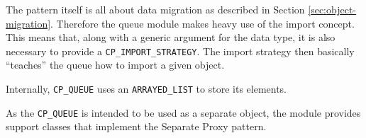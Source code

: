 The pattern itself is all about data migration as described in Section \ref{sec:object-migration}.
Therefore the queue module makes heavy use of the import concept.
This means that, along with a generic argument for the data type, it is also necessary to provide a \lstinline!CP_IMPORT_STRATEGY!.
The import strategy then basically ``teaches'' the queue how to import a given object.

Internally, \lstinline!CP_QUEUE! uses an \lstinline!ARRAYED_LIST! to store its elements.

As the \lstinline!CP_QUEUE! is intended to be used as a separate object, the module provides support classes that implement the Separate Proxy pattern.

% 
% 
% 

